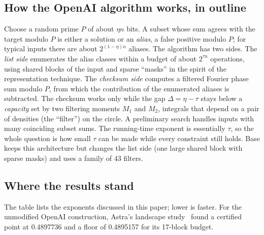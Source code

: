 \documentclass[11pt]{article}
\theoremstyle{plain}
\begin{document}
\subsection*{How the OpenAI algorithm works, in outline}
Choose a random prime $P$ of about $\eta n$ bits. A subset whose sum agrees with the target modulo $P$ is either a solution or an \emph{alias}, a false positive modulo $P$; for typical inputs there are about $2^{(1-\eta)n}$ aliases. The algorithm has two sides. The \emph{list side} enumerates the alias classes within a budget of about $2^{\tau n}$ operations, using shared blocks of the input and sparse ``masks'' in the spirit of the representation technique. The \emph{checksum side} computes a filtered Fourier phase sum modulo $P$, from which the contribution of the enumerated aliases is subtracted. The checksum works only while the gap $\Delta = \eta - \tau$ stays below a \emph{capacity} set by two filtering moments $M_1$ and $M_2$, integrals that depend on a pair of densities (the ``filter'') on the circle. A preliminary search handles inputs with many coinciding subset sums. The running-time exponent is essentially $\tau$, so the whole question is how small $\tau$ can be made while every constraint still holds. Base keeps this architecture but changes the list side (one large shared block with sparse masks) and uses a family of 43 filters.

\subsection*{Where the results stand}
The table lists the exponents discussed in this paper; lower is faster. For the unmodified OpenAI construction, Astra's landscape study~\cite{astra} found a certified point at 0.4897736 and a floor of 0.4895157 for its 17-block budget.
\end{document}
